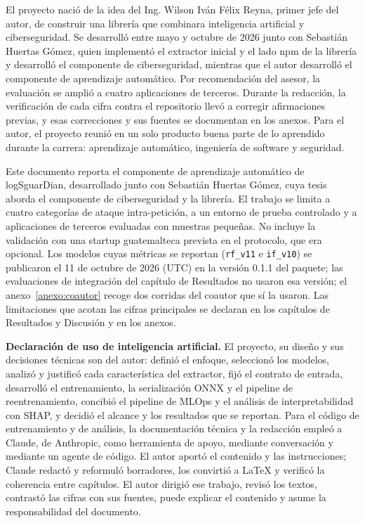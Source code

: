 El proyecto nació de la idea del Ing. Wilson Iván Félix Reyna, primer jefe del autor, de construir una librería que combinara inteligencia artificial y ciberseguridad. Se desarrolló entre mayo y octubre de 2026 junto con Sebastián Huertas Gómez, quien implementó el extractor inicial y el lado npm de la librería y desarrolló el componente de ciberseguridad, mientras que el autor desarrolló el componente de aprendizaje automático. Por recomendación del asesor, la evaluación se amplió a cuatro aplicaciones de terceros. Durante la redacción, la verificación de cada cifra contra el repositorio llevó a corregir afirmaciones previas, y esas correcciones y sus fuentes se documentan en los anexos. Para el autor, el proyecto reunió en un solo producto buena parte de lo aprendido durante la carrera: aprendizaje automático, ingeniería de software y seguridad.

Este documento reporta el componente de aprendizaje automático de logSguarDian, desarrollado junto con Sebastián Huertas Gómez, cuya tesis aborda el componente de ciberseguridad y la librería. El trabajo se limita a cuatro categorías de ataque intra-petición, a un entorno de prueba controlado y a aplicaciones de terceros evaluadas con muestras pequeñas. No incluye la validación con una startup guatemalteca prevista en el protocolo, que era opcional. Los modelos cuyas métricas se reportan (\texttt{rf\_v11} e \texttt{if\_v10}) se publicaron el 11 de octubre de 2026 (UTC) en la versión 0.1.1 del paquete; las evaluaciones de integración del capítulo de Resultados no usaron esa versión; el anexo~\ref{anexo:coautor} recoge dos corridas del coautor que sí la usaron. Las limitaciones que acotan las cifras principales se declaran en los capítulos de Resultados y Discusión y en los anexos.

\textbf{Declaración de uso de inteligencia artificial.} El proyecto, su diseño y sus decisiones técnicas son del autor: definió el enfoque, seleccionó los modelos, analizó y justificó cada característica del extractor, fijó el contrato de entrada, desarrolló el entrenamiento, la serialización ONNX y el pipeline de reentrenamiento, concibió el pipeline de MLOps y el análisis de interpretabilidad con SHAP, y decidió el alcance y los resultados que se reportan. Para el código de entrenamiento y de análisis, la documentación técnica y la redacción empleó a Claude, de Anthropic, como herramienta de apoyo, mediante conversación y mediante un agente de código. El autor aportó el contenido y las instrucciones; Claude redactó y reformuló borradores, los convirtió a \LaTeX{} y verificó la coherencia entre capítulos. El autor dirigió ese trabajo, revisó los textos, contrastó las cifras con sus fuentes, puede explicar el contenido y asume la responsabilidad del documento.

